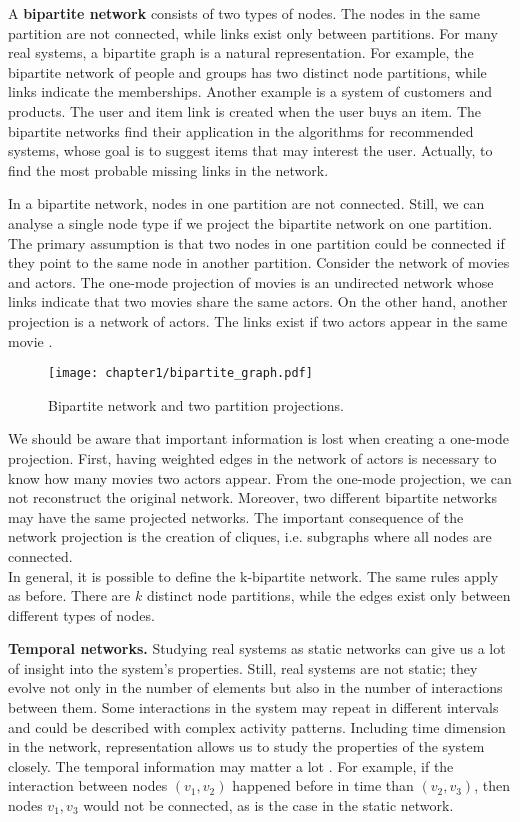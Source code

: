 A \textbf{bipartite network} consists of two types of nodes. The nodes in the same partition are not connected, while links exist only between partitions. For many real systems, a bipartite graph is a natural representation\cite{barabasi2016network, latora2017complex}. For example, the bipartite network of people and groups has two distinct node partitions, while links indicate the memberships. Another example is a system of customers and products. The user and item link is created when the user buys an item. The bipartite networks find their application in the algorithms for recommended systems, whose goal is to suggest items that may interest the user. Actually, to find the most probable missing links in the network. 

In a bipartite network, nodes in one partition are not connected. Still, we can analyse a single node type if we project the bipartite network on one partition. The primary assumption is that two nodes in one partition could be connected if they point to the same node in another partition. Consider the network of movies and actors. The one-mode projection of movies is an undirected network whose links indicate that two movies share the same actors. On the other hand, another projection is a network of actors. The links exist if two actors appear in the same movie \cite{newman2010, barabasi2016network}.

\begin{figure}[h]
	\centering
	\texttt{[image: chapter1/bipartite\_graph.pdf]} 
	\caption[Bipartite network.]{Bipartite network and two partition projections.}
	\label{fig:gt2}
\end{figure}

We should be aware that important information is lost when creating a one-mode projection. First, having weighted edges in the network of actors is necessary to know how many movies two actors appear. From the one-mode projection, we can not reconstruct the original network. Moreover, two different bipartite networks may have the same projected networks. The important consequence of the network projection is the creation of cliques, i.e. subgraphs where all nodes are connected. \\
In general, it is possible to define the k-bipartite network. The same rules apply as before. There are $k$ distinct node partitions, while the edges exist only between different types of nodes.

\textbf{Temporal networks.}
Studying real systems as static networks can give us a lot of insight into the system's properties. Still, real systems are not static; they evolve not only in the number of elements but also in the number of interactions between them. Some interactions in the system may repeat in different intervals and could be described with complex activity patterns. Including time dimension in the network, representation allows us to study the properties of the system closely. The temporal information may matter a lot \cite{holme2012}. For example, if the interaction between nodes $(v_1, v_2)$ happened before in time than  $(v_2, v_3)$, then nodes $v_1, v_3$ would not be connected, as is the case in the static network. 

